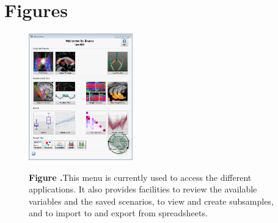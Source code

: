 \documentclass[utf8,paper]{frontiersSCNS} %
\begin{document}
\section*{Figures}

\begin{figure}[h!]
\begin{center}
\includegraphics[width=0.4\textwidth]{figures/braviz_menu.PNG}
\end{center}
 \textbf{\label{fig_menu} Figure .}{This menu is currently used to access the different applications. It also provides facilities to review the available variables and the saved scenarios, to view and create subsamples, and to import to and export from spreadsheets.  }
\end{figure}
\end{document}
